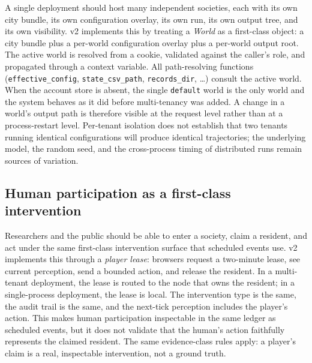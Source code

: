 A single deployment should host many independent societies, each with its
own city bundle, its own configuration overlay, its own run, its own output
tree, and its own visibility.  v2 implements this by treating a
\emph{World} as a first-class object: a city bundle plus a per-world
configuration overlay plus a per-world output root.  The active world is
resolved from a cookie, validated against the caller's role, and propagated
through a context variable.  All path-resolving functions
(\texttt{effective\_config}, \texttt{state\_csv\_path}, \texttt{records\_dir},
\ldots) consult the active world.  When the account store is absent, the
single \texttt{default} world is the only world and the system behaves as it
did before multi-tenancy was added.  A change in a world's output path is
therefore visible at the request level rather than at a process-restart
level.  Per-tenant isolation does not establish that two tenants running
identical configurations will produce identical trajectories; the underlying
model, the random seed, and the cross-process timing of distributed runs
remain sources of variation.

\subsection{Human participation as a first-class intervention}
\label{sec:dgo:participation}

Researchers and the public should be able to enter a society, claim a
resident, and act under the same first-class intervention surface that
scheduled events use.  v2 implements this through a \emph{player lease}:
browsers request a two-minute lease, see current perception, send a bounded
action, and release the resident.  In a multi-tenant deployment, the lease
is routed to the node that owns the resident; in a single-process
deployment, the lease is local.  The intervention type is the same, the
audit trail is the same, and the next-tick perception includes the player's
action.  This makes human participation inspectable in the same ledger as
scheduled events, but it does not validate that the human's action faithfully
represents the claimed resident.  The same evidence-class rules apply: a
player's claim is a real, inspectable intervention, not a ground truth.
